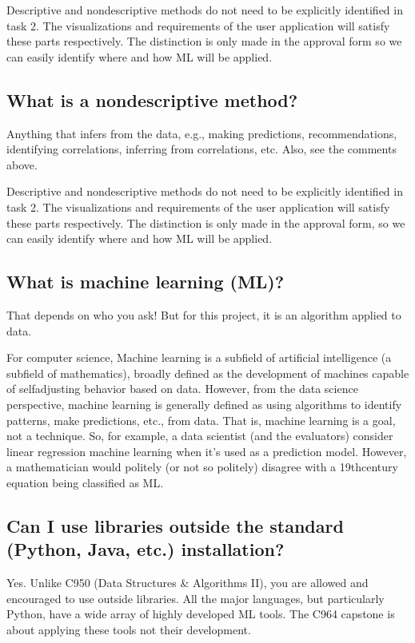 \documentclass[letterpaper,10pt,english]{jupyterBook}
\begin{document}
\sphinxAtStartPar
Descriptive and non\sphinxhyphen{}descriptive methods do not need to be explicitly identified in task 2. The visualizations and requirements of the user application will satisfy these parts respectively. The distinction is only made in the approval form so we can easily identify where and how ML will be applied.


\subsection{What is a non\sphinxhyphen{}descriptive method?}
\label{\detokenize{task1:what-is-a-non-descriptive-method}}
\sphinxAtStartPar
Anything that infers from the data, e.g., making predictions, recommendations, identifying correlations, inferring from correlations, etc. Also, see the comments above.

\sphinxAtStartPar
Descriptive and non\sphinxhyphen{}descriptive methods do not need to be explicitly identified in task 2. The visualizations and requirements of the user application will satisfy these parts respectively. The distinction is only made in the approval form, so we can easily identify where and how ML will be applied.


\subsection{What is machine learning (ML)?}
\label{\detokenize{task1:what-is-machine-learning-ml}}
\sphinxAtStartPar
That depends on who you ask! But for this project, it is an algorithm applied to data.

\sphinxAtStartPar
For computer science, Machine learning is a subfield of artificial intelligence (a subfield of mathematics), broadly defined as the development of machines capable of self\sphinxhyphen{}adjusting behavior based on data. However, from the data science perspective, machine learning is generally defined as using algorithms to identify patterns, make predictions, etc., from data. That is, machine learning is a goal, not a technique. So, for example, a data scientist (and the evaluators) consider linear regression machine learning \sphinxhyphen{}when it’s used as a prediction model. However, a mathematician would politely (or not so politely) disagree with a 19th\sphinxhyphen{}century equation being classified as ML.


\subsection{Can I use libraries outside the standard (Python, Java, etc.) installation?}
\label{\detokenize{task1:can-i-use-libraries-outside-the-standard-python-java-etc-installation}}
\sphinxAtStartPar
Yes. Unlike C950 (Data Structures \& Algorithms II), you are allowed and encouraged to use outside libraries. All the major languages, but particularly Python, have a wide array of highly developed ML tools. The C964 capstone is about applying these tools \sphinxhyphen{}not their development.
\end{document}
